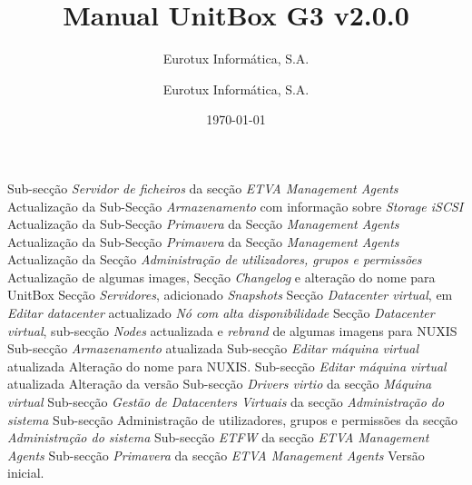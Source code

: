 \documentclass[12pt,a4paper,portuges]{scrreprt}
\author{Eurotux Informática, S.A.}
\title{Manual UnitBox G3 v2.0.0}
\subtitle{Eurotux Informática, S.A.}
\date{\today}
\begin{document}
\maketitle

\begin{Log}
Sub-secção \textit{Servidor de ficheiros} da secção \textit{ETVA Management Agents}
Actualização da Sub-Secção \textit{Armazenamento} com informação sobre \emph{Storage iSCSI}
Actualização da Sub-Secção \textit{Primavera} da Secção \textit{Management Agents}
Actualização da Sub-Secção \textit{Primavera} da Secção \textit{Management Agents}
Actualização da Secção \textit{Administração de utilizadores, grupos e permissões}
Actualização de algumas images, Secção \textit{Changelog} e alteração do nome para UnitBox
Secção \textit{Servidores}, adicionado \textit{Snapshots}
Secção \textit{Datacenter virtual}, em \textit{Editar datacenter} actualizado \textit{Nó com alta disponibilidade }
Secção \textit{Datacenter virtual}, sub-secção \textit{Nodes} actualizada e \textit{rebrand} de algumas imagens para NUXIS
Sub-secção \textit{Armazenamento} atualizada
Sub-secção \textit{Editar máquina virtual} atualizada
Alteração do nome para NUXIS. Sub-secção \textit{Editar máquina virtual} atualizada
Alteração da versão
Sub-secção \textit{Drivers virtio} da secção \textit{Máquina virtual}
Sub-secção \textit{Gestão de Datacenters Virtuais} da secção \textit{Administração do sistema}
Sub-secção Administração de utilizadores, grupos e permissões da secção \textit{Administração do sistema}
Sub-secção \textit{ETFW} da secção \textit{ETVA Management Agents}
Sub-secção \textit{Primavera} da secção \textit{ETVA Management Agents}
Versão inicial.
\end{Log}

\tableofcontents

\listoffigures


%
%




\end{document}
